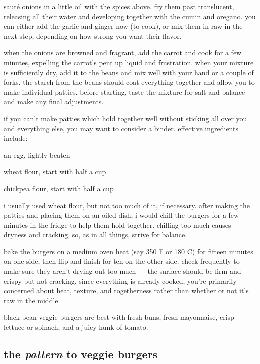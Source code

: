 saut\'{e} onions in a little oil with the spices above. fry them past 
translucent, releasing all their water and developing together with the cumin 
and oregano. you can either add the garlic and ginger now (to cook), or mix 
them in raw in the next step, depending on how strong you want their flavor.

when the onions are browned and fragrant, add the carrot and cook for a few 
minutes, expelling the carrot's pent up liquid and frustration. when your 
mixture is sufficiently dry, add it to the beans and mix well with your hand or 
a couple of forks. the starch from the beans should coat everything together 
and allow you to make individual patties. before starting, taste the mixture 
for salt and balance and make any final adjustments.

if you can't make patties which hold together well without sticking all over 
you and everything else, you may want to consider a binder. effective 
ingredients include:

\begin{ingredients}
  \item an egg, lightly beaten
  \item wheat flour, start with half a cup
  \item chickpea flour, start with half a cup
\end{ingredients}

i usually used wheat flour, but not too much of it, if necessary. after making 
the patties and placing them on an oiled dish, i would chill the burgers for a 
few minutes in the fridge to help them hold together. chilling too much causes 
dryness and cracking, so, as in all things, strive for balance.

bake the burgers on a medium oven heat (say 350 F or 180 C) for fifteen minutes 
on one side, then flip and finish for ten on the other side. check frequently 
to make sure they aren't drying out too much --- the surface should be firm and 
crispy but not cracking. since everything is already cooked, you're primarily 
concerned about heat, texture, and togetherness rather than whether or not it's 
raw in the middle.

black bean veggie burgers are best with fresh buns, fresh mayonnaise, crisp 
lettuce or spinach, and a juicy hunk of tomato.

\subsection{the \textit{pattern} to veggie burgers}

